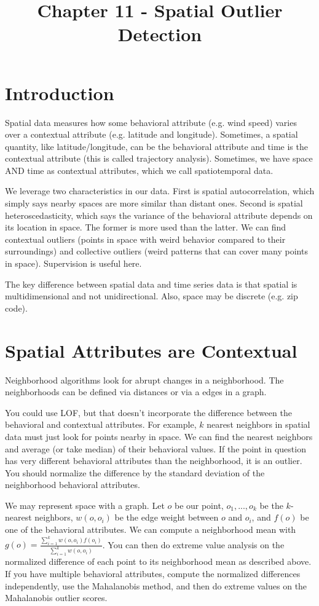 \documentclass[a4paper]{article}
\title{Chapter 11 - Spatial Outlier Detection}
\date{}
\begin{document}
\maketitle

\section{Introduction}
Spatial data measures how some behavioral attribute (e.g. wind speed) varies
over a contextual attribute (e.g. latitude and longitude). Sometimes, a
spatial quantity, like latitude/longitude, can be the behavioral attribute
and time is the contextual attribute (this is called trajectory analysis).
Sometimes, we have space AND time as contextual attributes, which we call
spatiotemporal data.

We leverage two characteristics in our data. First is spatial autocorrelation,
which simply says nearby spaces are more similar than distant ones. Second is
spatial heteroscedasticity, which says the variance of the behavioral attribute
depends on its location in space. The former is more used than the latter. We
can find contextual outliers (points in space with weird behavior compared
to their surroundings) and collective outliers (weird patterns that can cover
many points in space). Supervision is useful here.

The key difference between spatial data and time series data is that spatial
is multidimensional and not unidirectional. Also, space may be discrete (e.g.
zip code).

\section{Spatial Attributes are Contextual}
Neighborhood algorithms look for abrupt changes in a neighborhood. The
neighborhoods can be defined via distances or via a edges in a graph.

You could use LOF, but that doesn't incorporate the difference between
the behavioral and contextual attributes. For example, $k$ nearest neighbors
in spatial data must just look for points nearby in space. We can find the
nearest neighbors and average (or take median) of their behavioral values.
If the point in question has very different behavioral attributes than the
neighborhood, it is an outlier. You should normalize the difference by
the standard deviation of the neighborhood behavioral attributes.

We may represent space with a graph. Let $o$ be our point, $o_1, ..., o_k$ be
the $k$-nearest neighbors, $w(o, o_i)$ be the edge weight between $o$ and $o_i$,
and $f(o)$ be one of the behavioral attributes.
We can compute a neighborhood mean with $g(o) = \frac{\sum_{i=1}^{k}{w(o, o_i)
f(o_i)}}{\sum_{i=1}^{k}{w(o, o_i)}}$. You can then do extreme value analysis
on the normalized difference of each point to its neighborhood mean as
described above. If you have multiple behavioral attributes, compute the
normalized differences independently, use the Mahalanobis method, and then
do extreme values on the Mahalanobis outlier scores.
\end{document}
